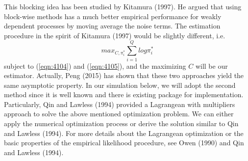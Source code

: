 \documentclass[oneside,english]{amsbook}
\numberwithin{section}{chapter}
\numberwithin{equation}{section}
\numberwithin{figure}{section}
\theoremstyle{plain}
\theoremstyle{plain}
\theoremstyle{definition}
\theoremstyle{plain}
\theoremstyle{plain}
\theoremstyle{remark}
\theoremstyle{definition}
\theoremstyle{definition}
\begin{document}
This blocking idea has been studied by Kitamura (1997). He argued that using block-wise methods has a much better empirical performance for weakly dependent processes by moving average the noise terms. The estimation procedure in the spirit of Kitamura (1997) would be slightly different, i.e. 
\begin{equation}
max_{C, \pi_i^*} \sum_{i=1}^{Q} log\pi_i^*
\end{equation}
subject to (\ref{eqn:4104}) and  (\ref{eqn:4105}), and the maximizing $C$ will be our estimator. Actually, Peng (2015) has shown that these two approaches yield the same asymptotic property. In our simulation below, we will adopt the second method since it is well known and there is existing package for implementation. Particularly, Qin and Lawless (1994) provided a Lagrangean with multipliers approach to solve the above mentioned optimization problem. We can either apply the numerical optimization process or derive the solution similar to Qin and Lawless (1994). For more details about the Lagrangean optimization or the basic properties of the empirical likelihood procedure, see Owen (1990) and Qin and Lawless (1994). 
  
\end{document}
